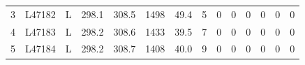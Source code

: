\documentclass[11pt]{article}
\begin{document}
\begin{table}[htbp]
{\begin{tabular}{c c c c c c c c c c c c c c}
      3                       & L47182                                   & L                        & 298.1                                                & 308.5                                                    & 1498                                                     & 49.4                                      & 5                                                       & 0                                             & 0                       & 0                       & 0                       & 0                       & 0                       \\
      4                       & L47183                                   & L                        & 298.2                                                & 308.6                                                    & 1433                                                     & 39.5                                      & 7                                                       & 0                                             & 0                       & 0                       & 0                       & 0                       & 0                       \\
      5                       & L47184                                   & L                        & 298.2                                                & 308.7                                                    & 1408                                                     & 40.0                                      & 9                                                       & 0                                             & 0                       & 0                       & 0                       & 0                       & 0                       \\
      \hline
    \end{tabular}
}
\end{table}
\end{document}
